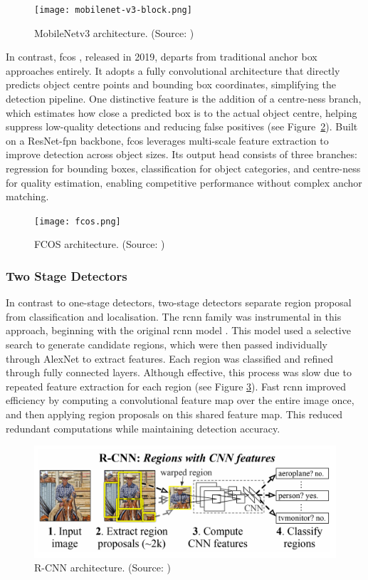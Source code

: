 \begin{figure}[!htbp]
\centering
\texttt{[image: mobilenet-v3-block.png]}
\caption{MobileNetv3 architecture. (Source: \cite{mobilenetv3})}
\label{fig:ssdlite2}
\end{figure}

In contrast, \gls{fcos} \cite{fcos}, released in 2019, departs from traditional anchor box approaches entirely. It adopts a fully convolutional architecture that directly predicts object centre points and bounding box coordinates, simplifying the detection pipeline. One distinctive feature is the addition of a centre-ness branch, which estimates how close a predicted box is to the actual object centre, helping suppress low-quality detections and reducing false positives (see Figure~\ref{fig:fcos}). Built on a ResNet-\gls{fpn} backbone, \gls{fcos} leverages multi-scale feature extraction to improve detection across object sizes. Its output head consists of three branches: regression for bounding boxes, classification for object categories, and centre-ness for quality estimation, enabling competitive performance without complex anchor matching.

\begin{figure}[!htbp]
\centering
\texttt{[image: fcos.png]}
\caption{FCOS architecture. (Source: \cite{fcos})}
\label{fig:fcos}
\end{figure}

\subsubsection{Two Stage Detectors}
\label{subsubsec:2_twostage}

In contrast to one-stage detectors, two-stage detectors separate region proposal from classification and localisation. The \gls{rcnn} family was instrumental in this approach, beginning with the original \gls{rcnn} model \cite{rcnn}. This model used a selective search to generate candidate regions, which were then passed individually through AlexNet \cite{alexnet} to extract features. Each region was classified and refined through fully connected layers. Although effective, this process was slow due to repeated feature extraction for each region (see Figure \ref{fig:rcnn}). Fast \gls{rcnn} \cite{fastrcnn} improved efficiency by computing a convolutional feature map over the entire image once, and then applying region proposals on this shared feature map. This reduced redundant computations while maintaining detection accuracy.

\begin{figure}[ht]
\centering
\includegraphics[width=0.9\linewidth]{content/chapters/2_background/figures/RCNN.png}
\caption{R-CNN architecture. (Source: \cite{rcnn})}
\label{fig:rcnn}
\end{figure}

